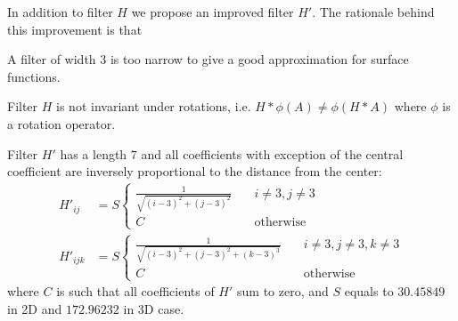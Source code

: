\documentclass[reprint,amsmath,amssymb,aps,pre,showkeys,showpacs]{revtex4-1}
\begin{document}
In addition to filter $H$ we propose an improved filter $H'$. The rationale
behind this improvement is that
\begin{enumerate*}[label=\alph*)]
\item A filter of width 3 is too narrow to give a good approximation for surface
  functions.
\item Filter $H$ is not invariant under rotations, i.e.
  $H*\phi(A) \ne \phi(H*A)$ where $\phi$ is a rotation operator.
\end{enumerate*}
Filter $H'$ has a length $7$ and all coefficients with exception of the central
coefficient are inversely proportional to the distance from the center:
\begin{equation}
  \begin{aligned}
    H'_{ij} &= S \left\{
    \begin{array}{cc}
      \frac{1}{\sqrt{(i-3)^2 + (j-3)^2}} & \quad i \ne 3, j \ne 3 \\
      C & \quad \text{otherwise}
    \end{array}
    \right. \\
    H'_{ijk} &= S \left\{
    \begin{array}{cc}
      \frac{1}{\sqrt{(i-3)^2 + (j-3)^2 + (k-3)^3}} & \quad i \ne 3, j \ne 3, k
      \ne 3 \\
      C & \quad \text{otherwise}
    \end{array}
    \right.
  \end{aligned}
  \label{eq:filter-7x7}
\end{equation}
where $C$ is such that all coefficients of $H'$ sum to zero, and $S$ equals to
$30.45849$ in 2D and $172.96232$ in 3D case.
\end{document}
